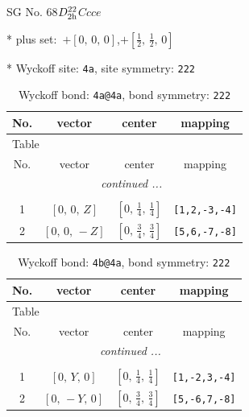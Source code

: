 \documentclass[fleqn,8pt]{jsarticle}
\begin{document}
\setcounter{MaxMatrixCols}{32}

\renewcommand{\tablename}{Table~}
\renewcommand{\figurename}{Figure~}
\begin{center}
\LARGE
SG No. 68\quad$D_{\rm 2h}^{22}$\quad$Ccce$\quad[ orthorhombic ]
\end{center}

* plus set:\,\,\,$+\left[ 0,\, 0,\, 0 \right]$,\quad $+\left[ \frac{1}{2},\, \frac{1}{2},\, 0 \right]$


* Wyckoff site: {\tt 4a}, site symmetry: {\tt 222}
\renewcommand{\arraystretch}{1.2}
\begin{longtable}{cccc}
\caption{Wyckoff bond: {\tt 4a@4a}, bond symmetry: {\tt 222}}
 \\
 \hline \hline
No. & vector & center & mapping \\ \hline \endfirsthead

\multicolumn{3}{l}{\tablename\ \thetable{}} \\
 \hline \hline
No. & vector & center & mapping \\ \hline \endhead

 \hline \hline
\multicolumn{3}{r}{\footnotesize\it continued ...} \\ \endfoot

 \hline \hline
\multicolumn{3}{r}{} \\ \endlastfoot

1 & $\left[ 0,\, 0,\, Z \right]$ & $\left[ 0,\, \frac{1}{4},\, \frac{1}{4} \right]$ & {\tt [1,2,-3,-4]} \\ \hline
2 & $\left[ 0,\, 0,\, - Z \right]$ & $\left[ 0,\, \frac{3}{4},\, \frac{3}{4} \right]$ & {\tt [5,6,-7,-8]} \\
\end{longtable}
\renewcommand{\arraystretch}{1.2}
\begin{longtable}{cccc}
\caption{Wyckoff bond: {\tt 4b@4a}, bond symmetry: {\tt 222}}
 \\
 \hline \hline
No. & vector & center & mapping \\ \hline \endfirsthead

\multicolumn{3}{l}{\tablename\ \thetable{}} \\
 \hline \hline
No. & vector & center & mapping \\ \hline \endhead

 \hline \hline
\multicolumn{3}{r}{\footnotesize\it continued ...} \\ \endfoot

 \hline \hline
\multicolumn{3}{r}{} \\ \endlastfoot

1 & $\left[ 0,\, Y,\, 0 \right]$ & $\left[ 0,\, \frac{1}{4},\, \frac{1}{4} \right]$ & {\tt [1,-2,3,-4]} \\ \hline
2 & $\left[ 0,\, - Y,\, 0 \right]$ & $\left[ 0,\, \frac{3}{4},\, \frac{3}{4} \right]$ & {\tt [5,-6,7,-8]} \\
\end{longtable}
\end{document}
